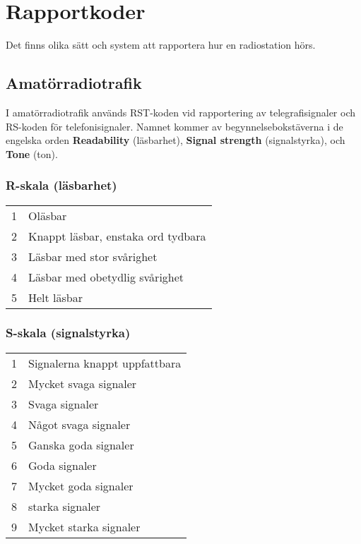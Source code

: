 \chapter{Rapportkoder}
\label{Rapportkoder}

\noindent
Det finns olika sätt och system att rapportera hur en radiostation hörs.

\section{Amatörradiotrafik}

I amatörradiotrafik används RST-koden vid rapportering av
telegrafisignaler och RS-koden för telefonisignaler.
Namnet kommer av begynnelsebokstäverna i de engelska orden
\textbf{Readability} (läsbarhet), \textbf{Signal strength} (signalstyrka), och \textbf{Tone} (ton).

\subsection{R-skala (läsbarhet)}

\begin{tabular}{p{}l}
1 & Oläsbar \\
2 & Knappt läsbar, enstaka ord tydbara \\
3 & Läsbar med stor svårighet \\
4 & Läsbar med obetydlig svårighet \\
5 & Helt läsbar \\
\end{tabular}

\subsection{S-skala (signalstyrka)}

\begin{tabular}{p{}l}
1 & Signalerna knappt uppfattbara \\
2 & Mycket svaga signaler \\
3 & Svaga signaler \\
4 & Något svaga signaler \\
5 & Ganska goda signaler \\
6 & Goda signaler \\
7 & Mycket goda signaler \\
8 & starka signaler \\
9 & Mycket starka signaler \\
\end{tabular}

